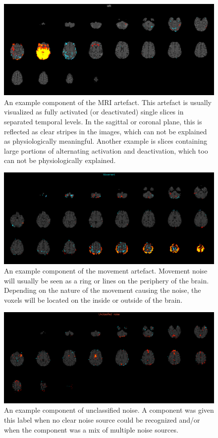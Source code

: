 \begin{figure}[H]                 
	\includegraphics[width=.85\textwidth]{figures/bMethods/MRI}  
	\caption{An example component of the MRI artefact. This artefact is usually visualized as fully activated (or deactivated) single slices in separated temporal levels. In the sagittal or coronal plane, this is reflected as clear stripes in the images, which can not be explained as physiologically meaningful. Another example is slices containing large portions of alternating activation and deactivation, which too can not be physiologically explained.}
	\label{fig:meth:MRI} 
\end{figure}
%


\begin{figure}[H]                 
	\includegraphics[width=.85\textwidth]{figures/bMethods/Movement}  
	\caption{An example component of the movement artefact. Movement noise will usually be seen as a ring or lines on the periphery of the brain. Depending on the nature of the movement causing the noise, the voxels will be located on the inside or outside of the brain.}
	\label{fig:meth:Movement} 
\end{figure}

\begin{figure}[H]                 
	\includegraphics[width=.85\textwidth]{figures/bMethods/U_noise}  
	\caption{An example component of unclassified noise. A component was given this label when no clear noise source could be recognized and/or when the component was a mix of multiple noise sources.}
	\label{fig:meth:Unoise} 
\end{figure}


